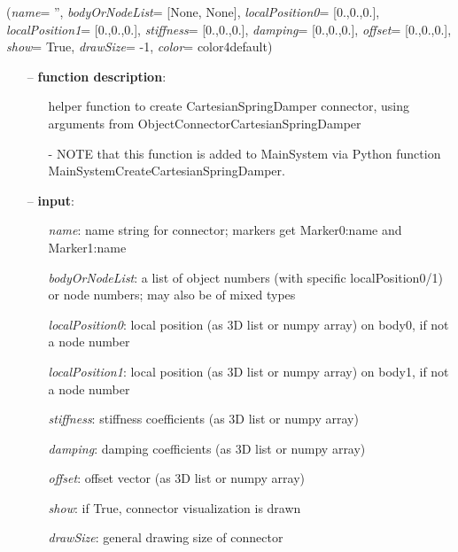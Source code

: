 %
\begin{flushleft}
\label{sec:mainsystemextensions:CreateCartesianSpringDamper}
({\it name}= '', {\it bodyOrNodeList}= [None, None], {\it localPosition0}= [0.,0.,0.], {\it localPosition1}= [0.,0.,0.], {\it stiffness}= [0.,0.,0.], {\it damping}= [0.,0.,0.], {\it offset}= [0.,0.,0.], {\it show}= True, {\it drawSize}= -1, {\it color}= color4default)
\end{flushleft}
\setlength{\itemindent}{0.7cm}
\begin{itemize}[leftmargin=0.7cm]
\item[--]
{\bf function description}: \vspace{-6pt}
\begin{itemize}[leftmargin=1.2cm]
\setlength{\itemindent}{-0.7cm}
\item[]helper function to create CartesianSpringDamper connector, using arguments from ObjectConnectorCartesianSpringDamper
\item[]- NOTE that this function is added to MainSystem via Python function MainSystemCreateCartesianSpringDamper.
\end{itemize}
\item[--]
{\bf input}: \vspace{-6pt}
\begin{itemize}[leftmargin=1.2cm]
\setlength{\itemindent}{-0.7cm}
\item[]{\it name}: name string for connector; markers get Marker0:name and Marker1:name
\item[]{\it bodyOrNodeList}: a list of object numbers (with specific localPosition0/1) or node numbers; may also be of mixed types
\item[]{\it localPosition0}: local position (as 3D list or numpy array) on body0, if not a node number
\item[]{\it localPosition1}: local position (as 3D list or numpy array) on body1, if not a node number
\item[]{\it stiffness}: stiffness coefficients (as 3D list or numpy array)
\item[]{\it damping}: damping coefficients (as 3D list or numpy array)
\item[]{\it offset}: offset vector (as 3D list or numpy array)
\item[]{\it show}: if True, connector visualization is drawn
\item[]{\it drawSize}: general drawing size of connector

\end{itemize}
\end{itemize}
